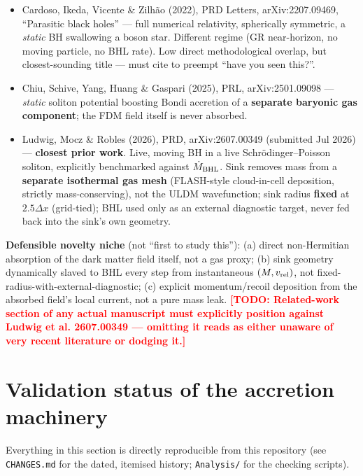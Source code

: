 \documentclass[11pt]{article}
\newcommand{\code}[1]{\texttt{#1}}
\newcommand{\TODO}[1]{\textcolor{red}{\textbf{[TODO: #1]}}}
\begin{document}
\begin{itemize}
  \item Cardoso, Ikeda, Vicente \& Zilh\~ao (2022), PRD Letters,
    arXiv:2207.09469, ``Parasitic black holes'' — full numerical relativity,
    spherically symmetric, a \emph{static} BH swallowing a boson star.
    Different regime (GR near-horizon, no moving particle, no BHL rate).
    Low direct methodological overlap, but closest-sounding title —
    must cite to preempt ``have you seen this?''.
  \item Chiu, Schive, Yang, Huang \& Gaspari (2025), PRL, arXiv:2501.09098
    — \emph{static} soliton potential boosting Bondi accretion of a
    \textbf{separate baryonic gas component}; the FDM field itself is never
    absorbed.
  \item Ludwig, Mocz \& Robles (2026), PRD, arXiv:2607.00349 (submitted
    Jul 2026) — \textbf{closest prior work}. Live, moving BH in a live
    Schr\"odinger--Poisson soliton, explicitly benchmarked against
    $\dot M_{\rm BHL}$. Sink removes mass from a \textbf{separate isothermal
    gas mesh} (FLASH-style cloud-in-cell deposition, strictly
    mass-conserving), not the ULDM wavefunction; sink radius \textbf{fixed}
    at $2.5\Delta x$ (grid-tied); BHL used only as an external diagnostic
    target, never fed back into the sink's own geometry.
\end{itemize}

\textbf{Defensible novelty niche} (not ``first to study this''): (a) direct
non-Hermitian absorption of the dark matter field itself, not a gas proxy;
(b) sink geometry dynamically slaved to BHL every step from instantaneous
$(M,v_{\rm rel})$, not fixed-radius-with-external-diagnostic; (c) explicit
momentum/recoil deposition from the absorbed field's local current, not a
pure mass leak. \TODO{Related-work section of any actual manuscript must
explicitly position against Ludwig et al. 2607.00349 — omitting it reads as
either unaware of very recent literature or dodging it.}

\section{Validation status of the accretion machinery}
\label{sec:validation}

Everything in this section is directly reproducible from this repository
(see \code{CHANGES.md} for the dated, itemised history; \code{Analysis/}
for the checking scripts).
\end{document}
